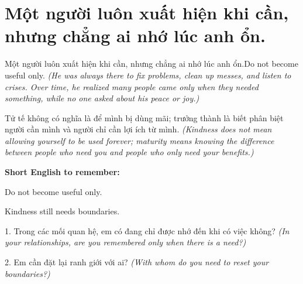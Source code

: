 \section{Một người luôn xuất hiện khi cần, nhưng chẳng ai nhớ lúc anh ổn.}
\begin{truyen}{Một người luôn xuất hiện khi cần, nhưng chẳng ai nhớ lúc anh ổn.}{Do not become useful only.}
\textit{(He was always there to fix problems, clean up messes, and listen to crises. Over time, he realized many people came only when they needed something, while no one asked about his peace or joy.)}
\end{truyen}
\begin{baihoc}
Tử tế không có nghĩa là để mình bị dùng mãi; trưởng thành là biết phân biệt người cần mình và người chỉ cần lợi ích từ mình.
\textit{(Kindness does not mean allowing yourself to be used forever; maturity means knowing the difference between people who need you and people who only need your benefits.)}
\end{baihoc}
\begin{ghinhoanh}
\textbf{Short English to remember:}

Do not become useful only.

Kindness still needs boundaries.
\end{ghinhoanh}
\begin{tuhocnhanh}
1. Trong các mối quan hệ, em có đang chỉ được nhớ đến khi có việc không? \textit{(In your relationships, are you remembered only when there is a need?)}

2. Em cần đặt lại ranh giới với ai? \textit{(With whom do you need to reset your boundaries?)}
\end{tuhocnhanh}
\ngancach